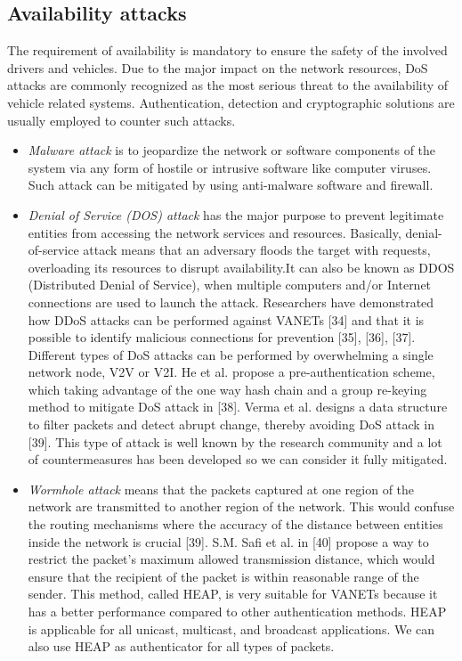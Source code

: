     \subsection{Availability attacks}
    The requirement of availability is mandatory to ensure the safety of the involved drivers and vehicles. Due to the major impact on the network resources, DoS attacks are commonly recognized as the most serious threat to the availability of vehicle related systems. Authentication, detection and cryptographic solutions are usually employed to counter such attacks.
    \begin{itemize}
        \item \textit{Malware attack} is to jeopardize the network or software components of the system via any form of hostile or intrusive software like computer viruses. Such attack can be mitigated by using anti-malware software and firewall.
        
        \item \textit{Denial of Service (DOS) attack} has the major purpose to prevent legitimate entities from accessing the network services and resources. Basically, denial-of-service attack means that an adversary floods the  target  with  requests, overloading its resources to disrupt availability.It can also be known as DDOS (Distributed Denial of Service), when multiple computers and/or Internet connections are used to launch the attack. Researchers have demonstrated how DDoS attacks can be performed against VANETs [34] and that it is possible to identify malicious connections for prevention [35], [36], [37]. Different types of DoS attacks can be performed by overwhelming a single network node, V2V or V2I.
        \newline
        He et al. propose a pre-authentication scheme, which taking advantage of the one way hash chain and a group re-keying method to mitigate DoS attack in [38]. 
        \newline
        Verma et al. designs a data structure to filter packets and detect abrupt change, thereby avoiding DoS attack in [39].
        \newline
        This type of attack is well known by the research community and a lot of countermeasures has been developed so we can consider it fully mitigated. 
        
        \item \textit{Wormhole attack} means that the packets captured at one region of the network are transmitted to another region of the network. This would confuse the routing mechanisms where the accuracy of the distance between entities inside the network is crucial [39]. 
        \newline 
        S.M. Safi et al. in [40] propose a way to restrict the packet’s maximum allowed transmission distance, which would ensure that the recipient of the packet is within reasonable range of the sender. This method, called HEAP, is very suitable for VANETs because it has a better performance compared to other authentication methods. HEAP is applicable for all unicast, multicast, and broadcast applications. We can also use HEAP as authenticator for all types of packets.
    \end{itemize}
    
